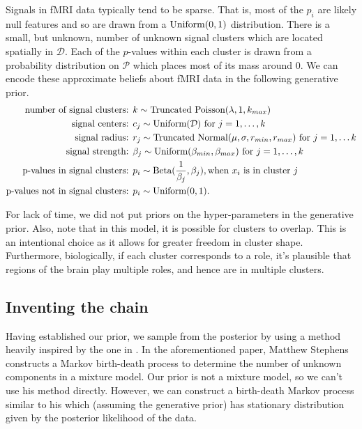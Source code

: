 \documentclass[12pt]{article}
\begin{document}
Signals in fMRI data typically tend to be sparse. That is, most of the $p_i$ are likely null features and so are drawn from a $\mbox{Uniform}(0,1)$ distribution. 
There is a small, but unknown, number of unknown signal clusters which are located spatially in $\mathcal{D}$.  
Each of the $p$-values within each cluster is drawn from a probability distribution on $\mathcal{P}$
which places most of its mass around $0$.  We can encode these approximate beliefs about fMRI data in the following generative prior. 
\begin{equation}
\begin{split}
\mbox{number of signal clusters: } & k \sim \mbox{Truncated Poisson}(\lambda,  1, k_{max}) \\
\mbox{signal centers: }&  c_j \sim \mbox{Uniform}(\mathcal{D}) \mbox{ for $j = 1, \ldots, k$} \\
\mbox{signal radius: }&  r_j \sim \mbox{Truncated Normal}(\mu,\sigma,r_{min},r_{max}) \mbox{ for $j = 1, \ldots k$} \\
\mbox{signal strength: }& \beta_j \sim \mbox{Uniform}(\beta_{min},\beta_{max}) \mbox{ for $j = 1, \ldots, k$} \\
\mbox{p-values in signal clusters: }& p_i \sim \mbox{Beta}(\frac{1}{\beta_j}, \beta_j), \mbox{when $x_i$ is in cluster $j$} \\
\mbox{p-values not in signal clusters: }& p_i \sim \mbox{Uniform}(0,1). 
\end{split}
\end{equation}


For lack of time, we did not put priors on the hyper-parameters in the generative prior. Also, note that in this model, it is possible for clusters to overlap. This is an intentional choice as it allows for greater freedom in cluster shape. Furthermore, biologically, if each cluster corresponds to a role, it's plausible that regions of the brain play multiple roles, and hence
are in multiple clusters. 

\subsection{Inventing the chain}

Having established our prior, we sample from the posterior by using a method heavily inspired by the one in \cite{stephens2000bayesian}. 
In the aforementioned paper, Matthew Stephens constructs a Markov birth-death process to determine the number of unknown components in a mixture model. Our prior is not a mixture model, so we can't use his method directly. However, we can construct a birth-death Markov process similar to his 
which (assuming the generative prior) has stationary distribution given by the posterior likelihood of the data. 
\end{document}

